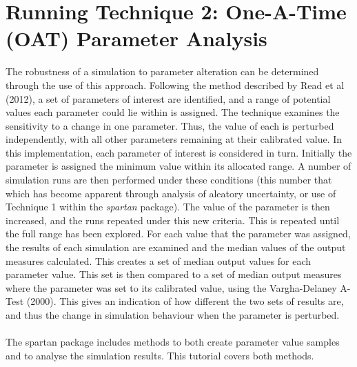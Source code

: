 \documentclass[a4paper,11pt]{article}
\begin{document}
\section{Running Technique 2: One-A-Time (OAT) Parameter Analysis}
\noindent The robustness of a simulation to parameter alteration can be determined through the use of this approach. Following the method described by Read et al (2012), a set of parameters of interest are identified, and a range of potential values each parameter could lie within is assigned.  The technique examines the sensitivity to a change in one parameter. Thus, the value of each is perturbed independently, with all other parameters remaining at their calibrated value. In this implementation, each parameter of interest is considered in turn. Initially the parameter is assigned the minimum value within its allocated range. A number of simulation runs are then performed under these conditions (this number that which has become apparent through analysis of aleatory uncertainty, or use of Technique 1 within the \textit{spartan} package). The value of the parameter is then increased, and the runs repeated under this new criteria.  This is repeated until the full range has been explored. For each value that the parameter was assigned, the results of each simulation are examined and the median values of the output measures calculated. This creates a set of median output values for each parameter value. This set is then compared to a set of median output measures where the parameter was set to its calibrated value, using the Vargha-Delaney A-Test (2000). This gives an indication of how different the two sets of results are, and thus the change in simulation behaviour when the parameter is perturbed.\\
\\
The spartan package includes methods to both create parameter value samples and to analyse the simulation results. This tutorial covers both methods.\\
\end{document}
